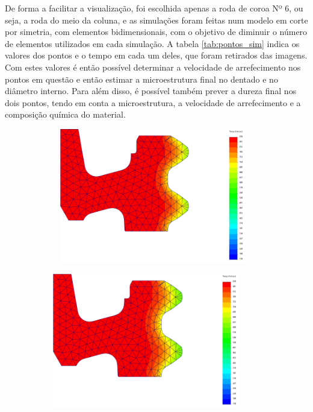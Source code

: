 De forma a facilitar a visualização, foi escolhida apenas a roda de coroa Nº 6, ou seja, a roda do meio da coluna, e as simulações foram feitas num modelo em corte por simetria, com elementos bidimensionais, com o objetivo de diminuir o número de elementos utilizados em cada simulação. A tabela \ref{tab:pontos_sim} indica os valores dos pontos e o tempo em cada um deles, que foram retirados das imagens. Com estes valores é então possível determinar a velocidade de arrefecimento nos pontos em questão e então estimar a microestrutura final no dentado e no diâmetro interno. Para além disso, é possível também prever a dureza final nos dois pontos, tendo em conta a microestrutura, a velocidade de arrefecimento e a composição química do material.
\newpage
\begin{figure}[htb]
    \centering
    \begin{subfigure}{.33\textwidth}\
        \centering
        \includegraphics[width = 0.9\textwidth]{Figures/Cap4/AC3_Dentado.png}
        \caption[]%
        {}
        \label{fig:A3_Dent}
    \end{subfigure}%
    \begin{subfigure}{.33\textwidth}
        \centering
        \includegraphics[width = 0.9\textwidth]{Figures/Cap4/AC1_Dentado.png}

\end{subfigure}
\end{figure}
